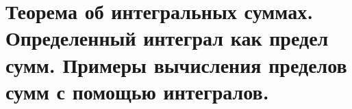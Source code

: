 \documentclass[../main.tex]{subfiles}
\begin{document}
\newpage
\section{Теорема об интегральных суммах. Определенный интеграл как предел сумм. Примеры вычисления пределов сумм с помощью интегралов.}
\end{document}

